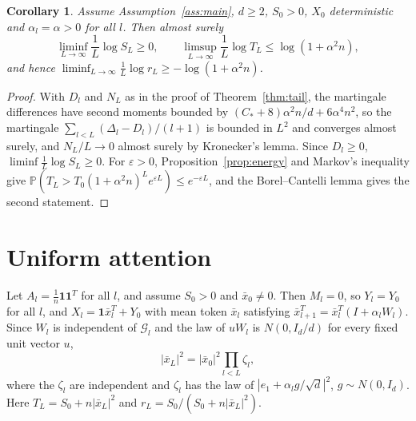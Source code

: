 \documentclass[11pt]{amsart}
\newtheorem{corollary}[theorem]{Corollary}
\theoremstyle{definition}
\theoremstyle{remark}
\numberwithin{equation}{section}
\newcommand{\PP}{\mathbb{P}}
\newcommand{\cG}{\mathcal{G}}
\begin{document}
\begin{corollary}\label{cor:fixed}
Assume Assumption~\ref{ass:main}, $d\ge2$, $S_0>0$, $X_0$ deterministic and $\alpha_l=\alpha>0$ for all $l$. Then almost surely
\[
\liminf_{L\to\infty}\frac1L\log S_L\ge0,\qquad\limsup_{L\to\infty}\frac1L\log T_L\le\log(1+\alpha^2n),
\]
and hence $\liminf_{L\to\infty}\frac1L\log r_L\ge-\log(1+\alpha^2n)$.
\end{corollary}

\begin{proof}
With $D_l$ and $N_L$ as in the proof of Theorem~\ref{thm:tail}, the martingale differences have second moments bounded by $(C_*+8)\alpha^2n/d+6\alpha^4n^2$, so the martingale $\sum_{l<L}(\Delta_l-D_l)/(l+1)$ is bounded in $L^2$ and converges almost surely, and $N_L/L\to0$ almost surely by Kronecker's lemma. Since $D_l\ge0$, $\liminf\frac1L\log S_L\ge0$. For $\varepsilon>0$, Proposition~\ref{prop:energy} and Markov's inequality give $\PP(T_L>T_0(1+\alpha^2n)^Le^{\varepsilon L})\le e^{-\varepsilon L}$, and the Borel--Cantelli lemma gives the second statement.
\end{proof}

\section{Uniform attention}\label{sec:uniform}

Let $A_l=\frac1n\mathbf 1\mathbf 1^{T}$ for all $l$, and assume $S_0>0$ and $\bar x_0\ne0$. Then $M_l=0$, so $Y_l=Y_0$ for all $l$, and $X_l=\mathbf 1\bar x_l^{T}+Y_0$ with mean token $\bar x_l$ satisfying $\bar x_{l+1}^{T}=\bar x_l^{T}(I+\alpha_lW_l)$. Since $W_l$ is independent of $\cG_l$ and the law of $uW_l$ is $N(0,I_d/d)$ for every fixed unit vector $u$,
\[
|\bar x_L|^2=|\bar x_0|^2\prod_{l<L}\zeta_l,
\]
where the $\zeta_l$ are independent and $\zeta_l$ has the law of $|e_1+\alpha_lg/\sqrt d|^2$, $g\sim N(0,I_d)$. Here $T_L=S_0+n|\bar x_L|^2$ and $r_L=S_0/(S_0+n|\bar x_L|^2)$.
\end{document}
